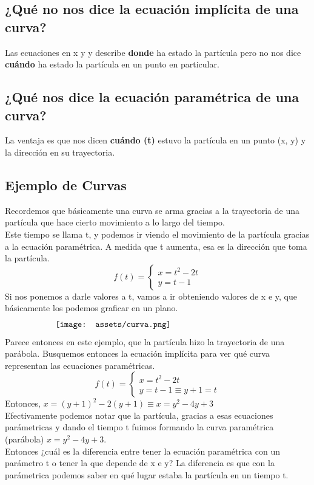 \documentclass[10pt,a4paper]{article}
\begin{document}
\subsection*{¿Qué no nos dice la ecuación implícita de una curva?}
Las ecuaciones en x y y describe \textbf{donde} ha estado la partícula pero no nos dice \textbf{cuándo} ha estado la partícula en un punto en particular. 
\subsection*{¿Qué nos dice la ecuación paramétrica de una curva?}
La ventaja es que nos dicen \textbf{cuándo (t)} estuvo la partícula en un punto (x, y) y la dirección en su trayectoria.
\subsection*{Ejemplo de Curvas}
Recordemos que básicamente una curva se arma gracias a la trayectoria de una partícula que hace cierto movimiento a lo largo del tiempo. \\
Este tiempo se llama t, y podemos ir viendo el movimiento de la partícula gracias a la ecuación paramétrica. A medida que t aumenta, esa es la dirección que toma la partícula. \\
\[
f(t) =
\begin{cases} 
x = t^{2} - 2t \\
y = t - 1
\end{cases}
\]
Si nos ponemos a darle valores a t, vamos a ir obteniendo valores de x e y, que básicamente los podemos graficar en un plano.
\[\begin{minipage}[b]{0.7\textwidth}
    \texttt{[image: assets/curva.png]}
\end{minipage}\]
Parece entonces en este ejemplo, que la partícula hizo la trayectoria de una parábola. Busquemos entonces la ecuación implícita para ver qué curva representan las ecuaciones paramétricas.
\[
f(t) =
\begin{cases} 
x = t^{2} - 2t \\
y = t - 1 \equiv y+1 = t
\end{cases}
\]
Entonces, $ x = (y+1)^{2} - 2(y+1) \equiv x = y^{2} -4y +3$ \\
Efectivamente podemos notar que la partícula, gracias a esas ecuaciones parámetricas y dando el tiempo t fuimos formando la curva paramétrica (parábola) $ x = y^{2} -4y +3$. \\
Entonces ¿cuál es la diferencia entre tener la ecuación paramétrica con un parámetro t o tener la que depende de x e y? La diferencia es que con la parámetrica podemos saber en qué lugar estaba la partícula en un tiempo t. \\
\end{document}
